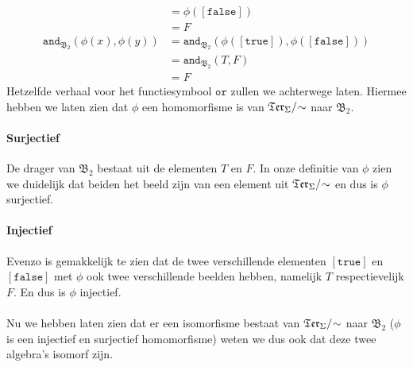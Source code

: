 \documentclass[a4paper,11pt]{article}
\begin{document}
\begin{description}
\begin{align*}
                                                       &= \phi([\texttt{false}]) \\
                                                       &= F
\end{align*}
\begin{align*}
\texttt{and}_{\mathfrak{B}_{2}}(\phi(x),\phi(y)) &= \texttt{and}_{\mathfrak{B}_{2}}(\phi([\texttt{true}]),\phi([\texttt{false}])) \\
                                                 &= \texttt{and}_{\mathfrak{B}_{2}}(T,F) \\
                                                 &= F
\end{align*}
Hetzelfde verhaal voor het functiesymbool $\texttt{or}$ zullen we achterwege
laten. Hiermee hebben we laten zien dat $\phi$ een homomorfisme is van
$\mathfrak{Ter}_{\Sigma}/\negmedspace\sim$ naar $\mathfrak{B}_{2}$.

\paragraph{Surjectief}

De drager van $\mathfrak{B}_{2}$ bestaat uit de elementen $T$ en $F$. In onze
definitie van $\phi$ zien we duidelijk dat beiden het beeld zijn van een
element uit $\mathfrak{Ter}_{\Sigma}/\negmedspace\sim$ en dus is $\phi$ surjectief.

\paragraph{Injectief}

Evenzo is gemakkelijk te zien dat de twee verschillende elementen
$[\texttt{true}]$ en $[\texttt{false}]$ met $\phi$ ook twee verschillende
beelden hebben, namelijk $T$ respectievelijk $F$. En dus is $\phi$ injectief.

\paragraph{}

Nu we hebben laten zien dat er een isomorfisme bestaat van
$\mathfrak{Ter}_{\Sigma}/\negmedspace\sim$ naar $\mathfrak{B}_{2}$ ($\phi$ is een
injectief en surjectief homomorfisme) weten we dus ook dat deze twee algebra's
isomorf zijn.

\end{description}
\end{document}
